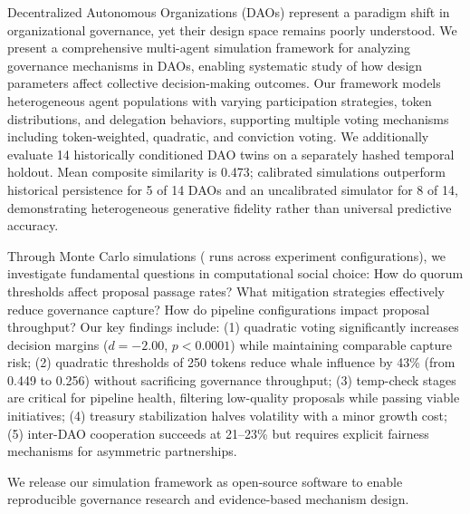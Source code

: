 
Decentralized Autonomous Organizations (DAOs) represent a paradigm shift in organizational governance, yet their design space remains poorly understood. We present a comprehensive multi-agent simulation framework for analyzing governance mechanisms in DAOs, enabling systematic study of how design parameters affect collective decision-making outcomes. Our framework models heterogeneous agent populations with varying participation strategies, token distributions, and delegation behaviors, supporting multiple voting mechanisms including token-weighted, quadratic, and conviction voting. We additionally evaluate 14 historically conditioned DAO twins on a separately hashed temporal holdout. Mean composite similarity is 0.473; calibrated simulations outperform historical persistence for 5 of 14 DAOs and an uncalibrated simulator for 8 of 14, demonstrating heterogeneous generative fidelity rather than universal predictive accuracy.

Through Monte Carlo simulations (\totalruns{} runs across \experimentcount{} experiment configurations), we investigate fundamental questions in computational social choice: How do quorum thresholds affect proposal passage rates? What mitigation strategies effectively reduce governance capture? How do pipeline configurations impact proposal throughput? Our key findings include: (1) quadratic voting significantly increases decision margins ($d = -2.00$, $p < 0.0001$) while maintaining comparable capture risk; (2) quadratic thresholds of 250 tokens reduce whale influence by 43\% (from 0.449 to 0.256) without sacrificing governance throughput; (3) temp-check stages are critical for pipeline health, filtering low-quality proposals while passing viable initiatives; (4) treasury stabilization halves volatility with a minor growth cost; (5) inter-DAO cooperation succeeds at 21--23\% but requires explicit fairness mechanisms for asymmetric partnerships.

We release our simulation framework as open-source software to enable reproducible governance research and evidence-based mechanism design.

